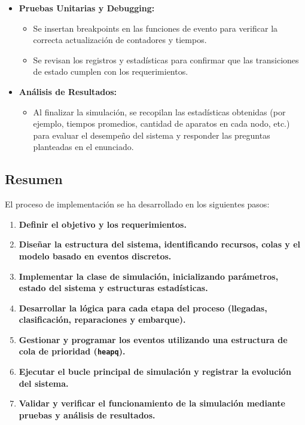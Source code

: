\documentclass[a4paper,12pt]{article}
\begin{document}
\begin{itemize}[leftmargin=2cm]
    \item \textbf{Pruebas Unitarias y Debugging:}
    \begin{itemize}
        \item Se insertan breakpoints en las funciones de evento para verificar la correcta actualización de contadores y tiempos.
        \item Se revisan los registros y estadísticas para confirmar que las transiciones de estado cumplen con los requerimientos.
    \end{itemize}
    \item \textbf{Análisis de Resultados:}
    \begin{itemize}
        \item Al finalizar la simulación, se recopilan las estadísticas obtenidas (por ejemplo, tiempos promedios, cantidad de aparatos en cada nodo, etc.) para evaluar el desempeño del sistema y responder las preguntas planteadas en el enunciado.
    \end{itemize}
\end{itemize}

\subsection{Resumen}

El proceso de implementación se ha desarrollado en los siguientes pasos:

\begin{enumerate}
    \item \textbf{Definir el objetivo y los requerimientos.}
    \item \textbf{Diseñar la estructura del sistema, identificando recursos, colas y el modelo basado en eventos discretos.}
    \item \textbf{Implementar la clase de simulación, inicializando parámetros, estado del sistema y estructuras estadísticas.}
    \item \textbf{Desarrollar la lógica para cada etapa del proceso (llegadas, clasificación, reparaciones y embarque).}
    \item \textbf{Gestionar y programar los eventos utilizando una estructura de cola de prioridad (\texttt{heapq}).}
    \item \textbf{Ejecutar el bucle principal de simulación y registrar la evolución del sistema.}
    \item \textbf{Validar y verificar el funcionamiento de la simulación mediante pruebas y análisis de resultados.}
\end{enumerate}
\end{document}
